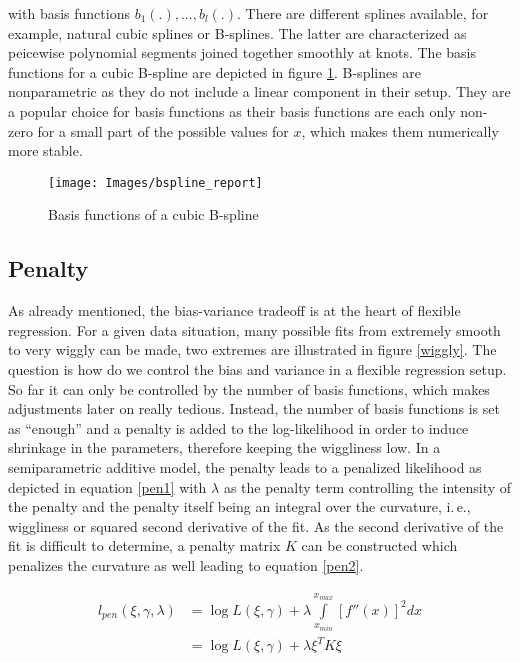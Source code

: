 \documentclass[12pt]{article}
\begin{document}
with basis functions $b_1(.), ..., b_l(.)$. There are different splines available, for example, natural cubic splines or B-splines. The latter are characterized as peicewise polynomial segments joined together smoothly at knots. The basis functions for a cubic B-spline are depicted in figure \ref{bsplines}. B-splines are nonparametric as they do not include a linear component in their setup. They are a popular choice for basis functions as their basis functions are each only non-zero for a small part of the possible values for $x$, which makes them numerically more stable.

\begin{figure}
\begin{center}
\texttt{[image: Images/bspline\_report]}
\end{center}
\vspace{-2em}
\caption[caption]{Basis functions of a cubic B-spline}\label{bsplines}
\end{figure}


\subsection{Penalty}

As already mentioned, the bias-variance tradeoff is at the heart of flexible regression. For a given data situation, many possible fits from extremely smooth to very wiggly can be made, two extremes are illustrated in figure \ref{wiggly}. The question is how do we control the bias and variance in a flexible regression setup. So far it can only be controlled by the number of basis functions, which makes adjustments later on really tedious. Instead, the number of basis functions is set as ``enough'' and a penalty is added to the log-likelihood in order to induce shrinkage in the parameters, therefore keeping the wiggliness low. In a semiparametric additive model, the penalty leads to a penalized likelihood as depicted in equation \ref{pen1} with $\lambda$ as the penalty term controlling the intensity of the penalty and the penalty itself being an integral over the curvature, i.\,e., wiggliness or squared second derivative of the fit. As the second derivative of the fit is difficult to determine, a penalty matrix $K$ can be constructed which penalizes the curvature as well leading to equation \ref{pen2}. 

\begin{align}
l_{pen}(\xi,\gamma, \lambda) &=  \log L(\xi, \gamma) + \lambda \int\limits_{x_{min}}^{x_{max}} \left[ f''(x)\right]^2dx \label{pen1}\\
 &= \log L(\xi, \gamma) + \lambda \xi^T K \xi\label{pen2}
\end{align}
\end{document}
